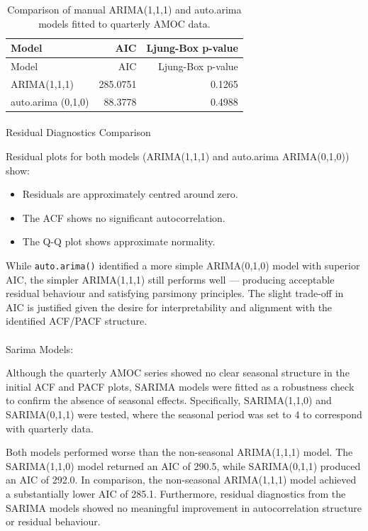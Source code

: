\documentclass[
  11pt,
]{article}
\makeatletter
\let\oldparagraph\paragraph
\renewcommand{\paragraph}{
    \@ifstar
      \xxxParagraphStar
      \xxxParagraphNoStar
  }
\newcommand{\xxxParagraphStar}[1]{\oldparagraph*{#1}\mbox{}}
\newcommand{\xxxParagraphNoStar}[1]{\oldparagraph{#1}\mbox{}}
\makeatother
\begin{document}
\begin{longtable}[]{@{}lrr@{}}
\caption{Comparison of manual ARIMA(1,1,1) and auto.arima models fitted
to quarterly AMOC data.}\tabularnewline
\toprule\noalign{}
Model & AIC & Ljung-Box p-value \\
\midrule\noalign{}
\endfirsthead
\toprule\noalign{}
Model & AIC & Ljung-Box p-value \\
\midrule\noalign{}
\endhead
\bottomrule\noalign{}
\endlastfoot
ARIMA(1,1,1) & 285.0751 & 0.1265 \\
auto.arima (0,1,0) & 88.3778 & 0.4988 \\
\end{longtable}

\paragraph{Residual Diagnostics
Comparison}\label{residual-diagnostics-comparison}

Residual plots for both models (ARIMA(1,1,1) and auto.arima
ARIMA(0,1,0)) show:

\begin{itemize}
\item
  Residuals are approximately centred around zero.
\item
  The ACF shows no significant autocorrelation.
\item
  The Q-Q plot shows approximate normality.
\end{itemize}

While \texttt{auto.arima()} identified a more simple ARIMA(0,1,0) model
with superior AIC, the simpler ARIMA(1,1,1) still performs well ---
producing acceptable residual behaviour and satisfying parsimony
principles. The slight trade-off in AIC is justified given the desire
for interpretability and alignment with the identified ACF/PACF
structure.

\paragraph{Sarima Models:}\label{sarima-models}

Although the quarterly AMOC series showed no clear seasonal structure in
the initial ACF and PACF plots, SARIMA models were fitted as a
robustness check to confirm the absence of seasonal effects.
Specifically, SARIMA(1,1,0) and SARIMA(0,1,1) were tested, where the
seasonal period was set to 4 to correspond with quarterly data.

Both models performed worse than the non-seasonal ARIMA(1,1,1) model.
The SARIMA(1,1,0) model returned an AIC of 290.5, while SARIMA(0,1,1)
produced an AIC of 292.0. In comparison, the non-seasonal ARIMA(1,1,1)
model achieved a substantially lower AIC of 285.1. Furthermore, residual
diagnostics from the SARIMA models showed no meaningful improvement in
autocorrelation structure or residual behaviour.
\end{document}
